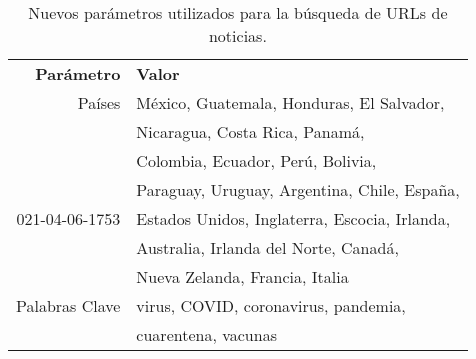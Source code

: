 \begin{table}[h]
    \centering
    \begin{tabular}{r|l}
        \textbf{Parámetro} & \textbf{Valor} \\
        Países  & México, Guatemala, Honduras, El Salvador, \\
                & Nicaragua, Costa Rica, Panamá, \\
                & Colombia, Ecuador, Perú, Bolivia, \\
                & Paraguay, Uruguay, Argentina, Chile, España, \\021-04-06-1753
                & Estados Unidos, Inglaterra, Escocia, Irlanda, \\
                & Australia, Irlanda del Norte, Canadá, \\
                & Nueva Zelanda, Francia, Italia \\
        Palabras Clave & virus, COVID, coronavirus, pandemia, \\
                & cuarentena, vacunas \\
    \end{tabular}
    \caption{Nuevos parámetros utilizados para la búsqueda de URLs de noticias.}
    \label{tab:news_final_parameters}
\end{table}